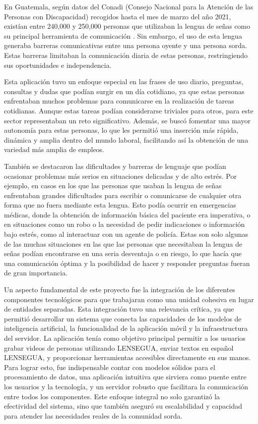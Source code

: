 En Guatemala, según datos del Conadi (Consejo Nacional para la Atención de las Personas con Discapacidad) recogidos hasta el mes de marzo del año 2021, existían entre 240,000 y 250,000 personas que utilizaban la lengua de señas como su principal herramienta de comunicación \cite{Conadi2021} . Sin embargo, el uso de esta lengua generaba barreras comunicativas entre una persona oyente y una persona sorda. Estas barreras limitaban la comunicación diaria de estas personas, restringiendo sus oportunidades e independencia.

Esta aplicación tuvo un enfoque especial en las frases de uso diario, preguntas, consultas y dudas que podían surgir en un día cotidiano, ya que estas personas enfrentaban muchos problemas para comunicarse en la realización de tareas cotidianas. Aunque estas tareas podían considerarse triviales para otros, para este sector representaban un reto significativo. Además, se buscó fomentar una mayor autonomía para estas personas, lo que les permitió una inserción más rápida, dinámica y amplia dentro del mundo laboral, facilitando así la obtención de una variedad más amplia de empleos.

También se destacaron las dificultades y barreras de lenguaje que podían ocasionar problemas más serios en situaciones delicadas y de alto estrés. Por ejemplo, en casos en los que las personas que usaban la lengua de señas enfrentaban grandes dificultades para escribir o comunicarse de cualquier otra forma que no fuera mediante esta lengua. Esto podía ocurrir en emergencias médicas, donde la obtención de información básica del paciente era imperativa, o en situaciones como un robo o la necesidad de pedir indicaciones o información bajo estrés, como al interactuar con un agente de policía. Estas son solo algunas de las muchas situaciones en las que las personas que necesitaban la lengua de señas podían encontrarse en una seria desventaja o en riesgo, lo que hacía que una comunicación óptima y la posibilidad de hacer y responder preguntas fueran de gran importancia.

Un aspecto fundamental de este proyecto fue la integración de los diferentes componentes tecnológicos para que trabajaran como una unidad cohesiva en lugar de entidades separadas. Esta integración tuvo una relevancia crítica, ya que permitió desarrollar un sistema que conecta las capacidades de los modelos de inteligencia artificial, la funcionalidad de la aplicación móvil y la infraestructura del servidor. La aplicación tenía como objetivo principal permitir a los usuarios grabar videos de personas utilizando LENSEGUA, enviar textos en español LENSEGUA, y proporcionar herramientas accesibles directamente en sus manos. Para lograr esto, fue indispensable contar con modelos sólidos para el procesamiento de datos, una aplicación intuitiva que sirviera como puente entre los usuarios y la tecnología, y un servidor robusto que facilitara la comunicación entre todos los componentes. Este enfoque integral no solo garantizó la efectividad del sistema, sino que también aseguró su escalabilidad y capacidad para atender las necesidades reales de la comunidad sorda.

